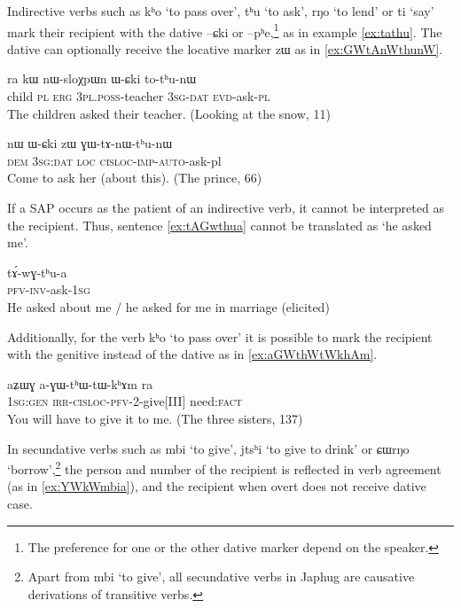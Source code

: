 \documentclass[oldfontcommands,oneside,a4paper,11pt]{article}
\newcommand{\ipa}[1]{{\phon #1}} %
\begin{document}
Indirective verbs such as \ipa{kʰo} `to pass over', \ipa{tʰu} `to ask', \ipa{rŋo} `to lend' or \ipa{ti} `say' mark their recipient with the dative \ipa{--ɕki} or \ipa{--pʰe},\footnote{The preference for one or the other dative marker depend on the speaker.} as in example \ref{ex:tathu}. The dative can optionally receive the locative marker \ipa{zɯ} as in \ref{ex:GWtAnWthunW}.
 \begin{exe}
   \ex   \label{ex:tathu}
 \gll \ipa{tɤpɤtso}  	\ipa{ra}  	\ipa{kɯ}  	\ipa{nɯ-sloχpɯn}  	\ipa{ɯ-ɕki}  	\ipa{to-tʰu-nɯ}  \\
child \textsc{pl} \textsc{erg} \textsc{3pl.poss}-teacher \textsc{3sg-dat} \textsc{evd}-ask-\textsc{pl} \\
\glt The children asked their teacher. (Looking at the snow, 11)
   \end{exe}  

 \begin{exe}
   \ex   \label{ex:GWtAnWthunW}
 \gll
\ipa{nɯ}  	\ipa{ɯ-ɕki}  	\ipa{zɯ}  	\ipa{ɣɯ-tɤ-nɯ-tʰu-nɯ}  \\
\textsc{dem } \textsc{3sg:dat} \textsc{loc} \textsc{cisloc-imp-auto}-ask-pl \\
\glt Come to ask her (about this). (The prince, 66)
   \end{exe}  

If a  SAP occurs as the patient of an indirective verb, it cannot be interpreted as the recipient. Thus, sentence \ref{ex:tAGwthua} cannot be translated as `he asked me'.

 \begin{exe}
   \ex   \label{ex:tAGwthua}
 \gll
\ipa{tɤ́-wɣ-tʰu-a} \\
\textsc{pfv-inv}-ask-\textsc{1sg}\\
\glt He asked about me / he asked for me in marriage (elicited)   
      \end{exe}  
      
   Additionally, for the verb \ipa{kʰo} `to pass over' it is possible to mark the recipient with the genitive instead of the dative as in \ref{ex:aGWthWtWkhAm}.
 \begin{exe}
   \ex   \label{ex:aGWthWtWkhAm}
 \gll
\ipa{aʑɯɣ}  	\ipa{a-ɣɯ-tʰɯ-tɯ-kʰɤm}  	\ipa{ra}  \\
\textsc{1sg:gen} \textsc{irr-cisloc-pfv}-2-give[III] need:\textsc{fact} \\
\glt You will have to give it to me. (The three sisters, 137)
   \end{exe}  


In secundative verbs such as \ipa{mbi} `to give', \ipa{jtsʰi} `to give to drink' or \ipa{ɕɯrŋo} `borrow',\footnote{Apart from \ipa{mbi} `to give', all secundative verbs in Japhug are causative derivations of transitive verbs.} the person and number of the recipient is reflected in verb agreement (as in \ref{ex:YWkWmbia}), and the recipient when overt does not receive dative case.
\end{document}
